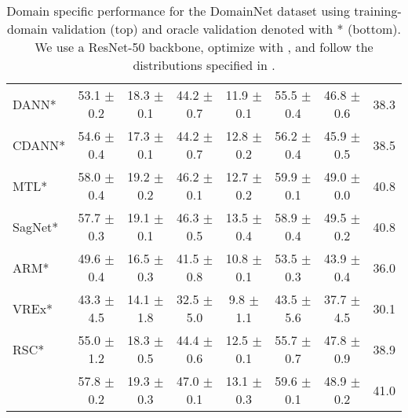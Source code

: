 \begin{table*}
\begin{center}
\begin{tabular}{lccccccc}
DANN*                 & 53.1 $\pm$ 0.2       & 18.3 $\pm$ 0.1       & 44.2 $\pm$ 0.7       & 11.9 $\pm$ 0.1       & 55.5 $\pm$ 0.4       & 46.8 $\pm$ 0.6       & 38.3                 \\
CDANN*                & 54.6 $\pm$ 0.4       & 17.3 $\pm$ 0.1       & 44.2 $\pm$ 0.7       & 12.8 $\pm$ 0.2       & 56.2 $\pm$ 0.4       & 45.9 $\pm$ 0.5       & 38.5                 \\
MTL*                  & 58.0 $\pm$ 0.4       & 19.2 $\pm$ 0.2       & 46.2 $\pm$ 0.1       & 12.7 $\pm$ 0.2       & 59.9 $\pm$ 0.1       & 49.0 $\pm$ 0.0       & 40.8                 \\
SagNet*               & 57.7 $\pm$ 0.3       & 19.1 $\pm$ 0.1       & 46.3 $\pm$ 0.5       & 13.5 $\pm$ 0.4       & 58.9 $\pm$ 0.4       & 49.5 $\pm$ 0.2       & 40.8                 \\
ARM*                  & 49.6 $\pm$ 0.4       & 16.5 $\pm$ 0.3       & 41.5 $\pm$ 0.8       & 10.8 $\pm$ 0.1       & 53.5 $\pm$ 0.3       & 43.9 $\pm$ 0.4       & 36.0                 \\
VREx*                 & 43.3 $\pm$ 4.5       & 14.1 $\pm$ 1.8       & 32.5 $\pm$ 5.0       & 9.8 $\pm$ 1.1        & 43.5 $\pm$ 5.6       & 37.7 $\pm$ 4.5       & 30.1                 \\
RSC*                  & 55.0 $\pm$ 1.2       & 18.3 $\pm$ 0.5       & 44.4 $\pm$ 0.6       & 12.5 $\pm$ 0.1       & 55.7 $\pm$ 0.7       & 47.8 $\pm$ 0.9       & 38.9                \\
\tdivcams 	           & 57.8 $\pm$ 0.2       & 19.3 $\pm$ 0.3        & 47.0 $\pm$ 0.1       & 13.1 $\pm$ 0.3      & 59.6 $\pm$ 0.1	     & 48.9 $\pm$ 0.2       & 41.0                 \\
\bottomrule
\end{tabular}
\caption[Domain specific performance for the DomainNet dataset]{Domain specific performance for the DomainNet dataset using training-domain validation (top) and  oracle validation denoted with * (bottom). We use a ResNet-50 backbone, optimize with \adam, and follow the distributions specified in \domainbed.}
\end{center}
\end{table*}